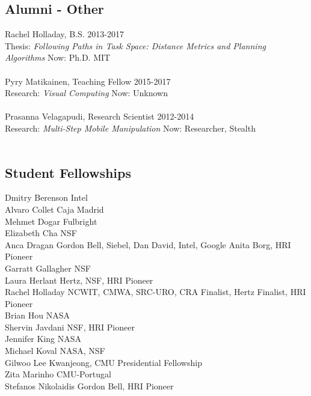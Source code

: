 \subsection{Alumni - Other}
\noindent
Rachel Holladay, B.S. \hfill 2013-2017\\
Thesis: \textit{Following Paths in Task Space: Distance Metrics and Planning Algorithms} \hfill Now: Ph.D. MIT\\
\\
Pyry Matikainen, Teaching Fellow \hfill 2015-2017 
\\Research: \textit{Visual Computing} \hfill Now: Unknown\\
\\
Prasanna Velagapudi, Research Scientist \hfill 2012-2014\\
Research: \textit{Multi-Step Mobile Manipulation }\hfill Now: Researcher, Stealth\\
\\

\subsection{Student Fellowships}
\noindent
Dmitry Berenson \hfill Intel\\
Alvaro Collet \hfill Caja Madrid\\
Mehmet Dogar \hfill Fulbright\\
Elizabeth Cha \hfill NSF\\
Anca Dragan \hfill Gordon Bell, Siebel, Dan David, Intel, Google Anita Borg, HRI Pioneer\\
Garratt Gallagher \hfill NSF\\
Laura Herlant \hfill Hertz, NSF, HRI Pioneer\\
Rachel Holladay \hfill NCWIT, CMWA, SRC-URO, CRA Finalist, Hertz Finalist, HRI Pioneer\\
Brian Hou \hfill NASA\\
Shervin Javdani \hfill NSF, HRI Pioneer\\
Jennifer King \hfill NASA\\
Michael Koval \hfill NASA, NSF\\
Gilwoo Lee \hfill Kwanjeong, CMU Presidential Fellowship \\
Zita Marinho \hfill CMU-Portugal\\
Stefanos Nikolaidis \hfill Gordon Bell, HRI Pioneer\\


